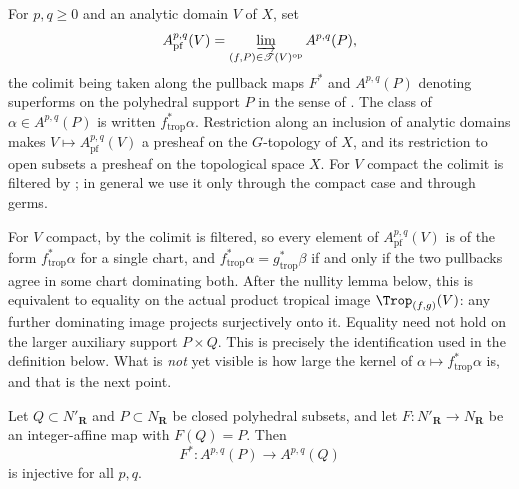 \begin{definition}
\label{def:ch13-presheaf}
For $p,q\ge0$ and an analytic domain $V$ of $X$, set
\[
 A^{p,q}_{\mathrm{pf}}(V)
 =\varinjlim_{(f,P)\in\mathscr T(V)^{\mathrm{op}}}A^{p,q}(P),
\]
the colimit being taken along the pullback maps $F^*$ and $A^{p,q}(P)$
denoting superforms on the polyhedral support $P$ in the sense of
.  The class of $\alpha\in A^{p,q}(P)$ is
written $f_{\mathrm{trop}}^*\alpha$.  Restriction along an inclusion of
analytic domains makes $V\mapsto A^{p,q}_{\mathrm{pf}}(V)$ a presheaf on the
$G$-topology of $X$, and its restriction to open subsets a presheaf on the
topological space $X$.  For $V$ compact the colimit is filtered by
; in general we use it only through the
compact case and through germs.
\end{definition}

For $V$ compact, by  the colimit is filtered,
so every element
of $A^{p,q}_{\mathrm{pf}}(V)$ is of the form $f_{\mathrm{trop}}^*\alpha$ for
a single chart, and
$f_{\mathrm{trop}}^*\alpha=g_{\mathrm{trop}}^*\beta$ if and only if the two
pullbacks agree in some chart dominating both.  After the nullity lemma
below, this is equivalent to equality on the actual product tropical image
$\Trop_{(f,g)}(V)$: any further dominating image projects surjectively onto
it.  Equality need not hold on the larger auxiliary support $P\times Q$.
This is precisely the
identification used in the definition below.  What is \emph{not} yet visible
is how large the kernel of $\alpha\mapsto f_{\mathrm{trop}}^*\alpha$ is, and
that is the next point.

\begin{lemma}
\label{lem:ch13-surjective-pullback-injective}
Let $Q\subset N'_{\mathbf R}$ and $P\subset N_{\mathbf R}$ be closed
polyhedral subsets, and let $F:N'_{\mathbf R}\to N_{\mathbf R}$ be an
integer-affine map with $F(Q)=P$.  Then
\[
 F^*:A^{p,q}(P)\longrightarrow A^{p,q}(Q)
\]
is injective for all $p,q$.
\end{lemma}

